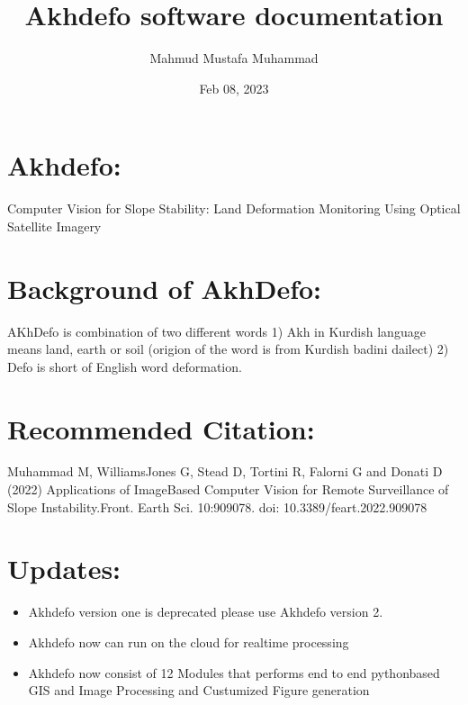 \documentclass[letterpaper,10pt]{sphinxmanual}
\title{Akhdefo software documentation}
\date{Feb 08, 2023}
\author{Mahmud Mustafa Muhammad}
\begin{document}
\pagestyle{empty}
\cover
\pagestyle{plain}
\sphinxtableofcontents
\pagestyle{normal}
\label{\detokenize{index::doc}}


\sphinxstepscope


\chapter{Akhdefo:}
\label{\detokenize{README:akhdefo}}\label{\detokenize{README::doc}}
\sphinxAtStartPar
Computer Vision for Slope Stability: Land Deformation Monitoring Using Optical Satellite Imagery


\chapter{Background of Akh\sphinxhyphen{}Defo:}
\label{\detokenize{README:background-of-akh-defo}}
\sphinxAtStartPar
AKh\sphinxhyphen{}Defo is combination of two different words 1) Akh in Kurdish language means land, earth or soil (origion of the word is from Kurdish badini dailect) 2) Defo is short of English word deformation.


\chapter{Recommended Citation:}
\label{\detokenize{README:recommended-citation}}
\sphinxAtStartPar
Muhammad M, Williams\sphinxhyphen{}Jones G, Stead D, Tortini R, Falorni G and Donati D (2022) Applications of ImageBased Computer Vision for Remote Surveillance of Slope Instability.Front. Earth Sci. 10:909078. doi: 10.3389/feart.2022.909078


\chapter{Updates:}
\label{\detokenize{README:updates}}\begin{itemize}
\item {} 
\sphinxAtStartPar
Akhdefo version one is deprecated please use Akhdefo version 2.

\item {} 
\sphinxAtStartPar
Akhdefo now can run on the cloud for real\sphinxhyphen{}time processing

\item {} 
\sphinxAtStartPar
Akhdefo now consist of 12 Modules that performs end to end python\sphinxhyphen{}based GIS and Image Processing and Custumized Figure generation

\end{itemize}
\end{document}
